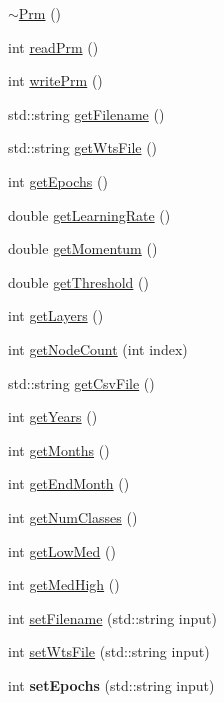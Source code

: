 \begin{DoxyCompactItemize}
\item 
\hyperlink{classPrm_aee17296d5aed3b88420a62a2185f3bf9}{$\sim$\-Prm} ()
\item 
int \hyperlink{classPrm_a86cfc66d28a7b2d5ff0f00682448b5cc}{read\-Prm} ()
\item 
int \hyperlink{classPrm_ae7efb4cd15c4fa2b581f5ec516018ec2}{write\-Prm} ()
\item 
std\-::string \hyperlink{classPrm_a7ab628ec643cc240fd9979df81a4ecb0}{get\-Filename} ()
\item 
std\-::string \hyperlink{classPrm_a09dc17d58a61737ed513d8d5c6cbaeae}{get\-Wts\-File} ()
\item 
int \hyperlink{classPrm_a0bda0fec335fce1dcdba315a15b31edf}{get\-Epochs} ()
\item 
double \hyperlink{classPrm_a9a12b899f11e0907e27dccfd65419677}{get\-Learning\-Rate} ()
\item 
double \hyperlink{classPrm_a07542e2fc8093909c7c3605c3e908ccb}{get\-Momentum} ()
\item 
double \hyperlink{classPrm_ab3d757e98a474f1dc8a9cbd2e5296c82}{get\-Threshold} ()
\item 
int \hyperlink{classPrm_a2dd4ccfd107de996eddb983529164c2b}{get\-Layers} ()
\item 
int \hyperlink{classPrm_a6e807edee7fa65407fd1ebf01e381443}{get\-Node\-Count} (int index)
\item 
std\-::string \hyperlink{classPrm_aaa889209a4dfd53f505ad40f7a29db4b}{get\-Csv\-File} ()
\item 
int \hyperlink{classPrm_a00fc7382bd10e89bc1c76a51c2213c31}{get\-Years} ()
\item 
int \hyperlink{classPrm_a30316047049e959eac21840f5095dcaa}{get\-Months} ()
\item 
int \hyperlink{classPrm_a44972b47eb79e02a12452bab99323803}{get\-End\-Month} ()
\item 
int \hyperlink{classPrm_a5e3f77b5e785047d4df1cc56feed9e6e}{get\-Num\-Classes} ()
\item 
int \hyperlink{classPrm_a8dff72e78d8035aab1ced3a932c18922}{get\-Low\-Med} ()
\item 
int \hyperlink{classPrm_a72ebfd538bb7ccef05219381d3fbf904}{get\-Med\-High} ()
\item 
int \hyperlink{classPrm_a8dcc18be467324d78416adeeea3d0260}{set\-Filename} (std\-::string input)
\item 
int \hyperlink{classPrm_ae0340fa267f847901c330b40b368cc72}{set\-Wts\-File} (std\-::string input)
\item 
\hypertarget{classPrm_ae0881471305d45e9d7d002fdd84cb233}{int {\bfseries set\-Epochs} (std\-::string input)}\label{classPrm_ae0881471305d45e9d7d002fdd84cb233}


\end{DoxyCompactItemize}
